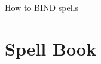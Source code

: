 \documentclass[a4paper,openany]{book}
\begin{document}
\frontpage%
	{How to BIND spells}%

\mainmatter

\chapter{Spell Book}







\backmatter

\printindex[spells]
\end{document}
